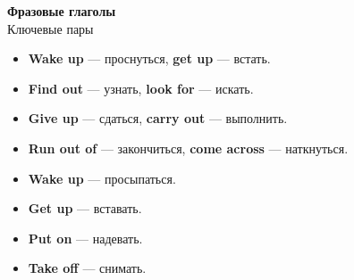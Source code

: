 \documentclass[12pt, a4paper]{article}
\begin{document}
\begin{center}
    {\Huge\bfseries\color{orange} Фразовые глаголы} \\
    \vspace{0.3em}
    {\large\color{darkgray} Ключевые пары}
\end{center}
\vspace{0.8em}

\noindent
\begin{minipage}{0.48\textwidth}
\begin{boxblue}[title=Самые важные пары]
\begin{itemize}
    \item \textbf{Wake up} — проснуться, \textbf{get up} — встать.
    \item \textbf{Find out} — узнать, \textbf{look for} — искать.
    \item \textbf{Give up} — сдаться, \textbf{carry out} — выполнить.
    \item \textbf{Run out of} — закончиться, \textbf{come across} — наткнуться.
\end{itemize}
\end{boxblue}
\end{minipage}
\hfill
\begin{minipage}{0.48\textwidth}
\begin{boxgreen}[title=Daily routine — Повторение]
\begin{itemize}
    \item \textbf{Wake up} — просыпаться.
    \item \textbf{Get up} — вставать.
    \item \textbf{Put on} — надевать.
    \item \textbf{Take off} — снимать.
\end{itemize}
\end{boxgreen}
\end{minipage}

\vspace{0.8em}
\end{document}
